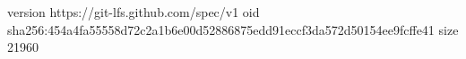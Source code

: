 version https://git-lfs.github.com/spec/v1
oid sha256:454a4fa55558d72c2a1b6e00d52886875edd91eccf3da572d50154ee9fcffe41
size 21960
